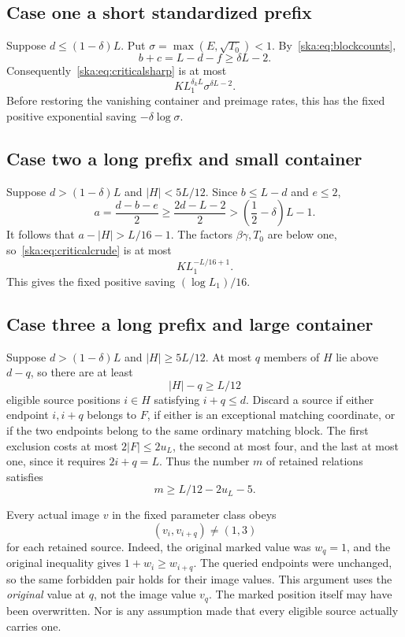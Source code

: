 \documentclass[11pt,letterpaper]{article}
\theoremstyle{definition}
\begin{document}
\subsection{Case one a short standardized prefix}
Suppose $d\le(1-\delta)L$. Put $\sigma=\max(E,\sqrt{T_0})<1$. By~\eqref{ska:eq:blockcounts},
\[
b+c=L-d-f\ge\delta L-2.
\]
Consequently~\eqref{ska:eq:criticalsharp} is at most
\begin{equation}\label{ska:eq:caseone}
K L_1^{\delta_kL}\sigma^{\delta L-2}.
\end{equation}
Before restoring the vanishing container and preimage rates, this has the fixed positive exponential saving $-\delta\log\sigma$.

\subsection{Case two a long prefix and small container}
Suppose $d>(1-\delta)L$ and $|H|<5L/12$. Since $b\le L-d$ and $e\le2$,
\[
a=\frac{d-b-e}{2}\ge\frac{2d-L-2}{2}
>\left(\frac12-\delta\right)L-1.
\]
It follows that $a-|H|>L/16-1$. The factors $\beta\gamma,T_0$ are below one, so~\eqref{ska:eq:criticalcrude} is at most
\begin{equation}\label{ska:eq:casetwo}
K L_1^{-L/16+1}.
\end{equation}
This gives the fixed positive saving $(\log L_1)/16$.

\subsection{Case three a long prefix and large container}
Suppose $d>(1-\delta)L$ and $|H|\ge5L/12$. At most $q$ members of $H$ lie above $d-q$, so there are at least
\[
|H|-q\ge L/12
\]
eligible source positions $i\in H$ satisfying $i+q\le d$. Discard a source if either endpoint $i,i+q$ belongs to $F$, if either is an exceptional matching coordinate, or if the two endpoints belong to the same ordinary matching block. The first exclusion costs at most $2|F|\le2u_L$, the second at most four, and the last at most one, since it requires $2i+q=L$. Thus the number $m$ of retained relations satisfies
\begin{equation}\label{ska:eq:mrelations}
m\ge L/12-2u_L-5.
\end{equation}

Every actual image $v$ in the fixed parameter class obeys
\begin{equation}\label{ska:eq:translated}
(v_i,v_{i+q})\ne(1,3)
\end{equation}
for each retained source. Indeed, the original marked value was $w_q=1$, and the original inequality gives $1+w_i\ge w_{i+q}$. The queried endpoints were unchanged, so the same forbidden pair holds for their image values. This argument uses the \emph{original} value at $q$, not the image value $v_q$. The marked position itself may have been overwritten. Nor is any assumption made that every eligible source actually carries one.
\end{document}
